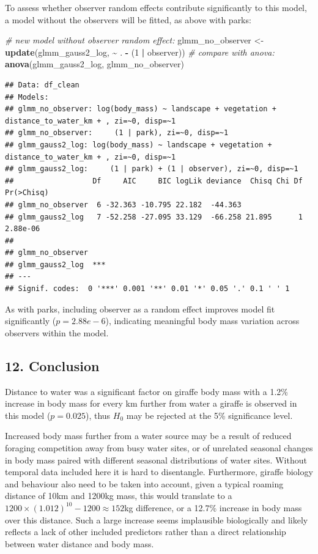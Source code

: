 \documentclass[
]{article}
\newenvironment{Shaded}{\begin{snugshade}}{\end{snugshade}}
\newcommand{\CommentTok}[1]{\textcolor[rgb]{0.56,0.35,0.01}{\textit{#1}}}
\newcommand{\DecValTok}[1]{\textcolor[rgb]{0.00,0.00,0.81}{#1}}
\newcommand{\FunctionTok}[1]{\textcolor[rgb]{0.13,0.29,0.53}{\textbf{#1}}}
\newcommand{\NormalTok}[1]{#1}
\newcommand{\OtherTok}[1]{\textcolor[rgb]{0.56,0.35,0.01}{#1}}
\newcommand{\SpecialCharTok}[1]{\textcolor[rgb]{0.81,0.36,0.00}{\textbf{#1}}}
\begin{document}
To assess whether observer random effects contribute significantly to
this model, a model without the observers will be fitted, as above with
parks:

\begin{Shaded}
\begin{Highlighting}[]
\CommentTok{\# new model without observer random effect:}
\NormalTok{glmm\_no\_observer }\OtherTok{\textless{}{-}} \FunctionTok{update}\NormalTok{(glmm\_gauss2\_log, }\SpecialCharTok{\textasciitilde{}}\NormalTok{ . }\SpecialCharTok{{-}}\NormalTok{ (}\DecValTok{1} \SpecialCharTok{|}\NormalTok{ observer))}
\CommentTok{\# compare with anova:}
\FunctionTok{anova}\NormalTok{(glmm\_gauss2\_log, glmm\_no\_observer)}
\end{Highlighting}
\end{Shaded}

\begin{verbatim}
## Data: df_clean
## Models:
## glmm_no_observer: log(body_mass) ~ landscape + vegetation + distance_to_water_km + , zi=~0, disp=~1
## glmm_no_observer:     (1 | park), zi=~0, disp=~1
## glmm_gauss2_log: log(body_mass) ~ landscape + vegetation + distance_to_water_km + , zi=~0, disp=~1
## glmm_gauss2_log:     (1 | park) + (1 | observer), zi=~0, disp=~1
##                  Df     AIC     BIC logLik deviance  Chisq Chi Df Pr(>Chisq)
## glmm_no_observer  6 -32.363 -10.795 22.182  -44.363                         
## glmm_gauss2_log   7 -52.258 -27.095 33.129  -66.258 21.895      1   2.88e-06
##                     
## glmm_no_observer    
## glmm_gauss2_log  ***
## ---
## Signif. codes:  0 '***' 0.001 '**' 0.01 '*' 0.05 '.' 0.1 ' ' 1
\end{verbatim}

As with parks, including observer as a random effect improves model fit
significantly (\(p = 2.88e-6\)), indicating meaningful body mass
variation across observers within the model.

\subsection{12. Conclusion}\label{conclusion}

Distance to water was a significant factor on giraffe body mass with a
1.2\% increase in body mass for every km further from water a giraffe is
observed in this model (\(p = 0.025\)), thus \(H_0\) may be rejected at
the 5\% significance level.

Increased body mass further from a water source may be a result of
reduced foraging competition away from busy water sites, or of unrelated
seasonal changes in body mass paired with different seasonal
distributions of water sites. Without temporal data included here it is
hard to disentangle. Furthermore, giraffe biology and behaviour also
need to be taken into account, given a typical roaming distance of 10km
and 1200kg mass, this would translate to a
\(1200 \times (1.012)^{10} - 1200 \approx 152\)kg difference, or a
12.7\% increase in body mass over this distance. Such a large increase
seems implausible biologically and likely reflects a lack of other
included predictors rather than a direct relationship between water
distance and body mass.
\end{document}
